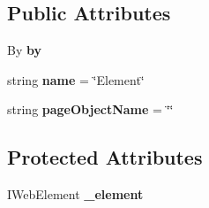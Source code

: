 \subsection*{Public Attributes}
\begin{DoxyCompactItemize}
\item 
\hypertarget{class_proto_test_1_1_golem_1_1_web_driver_1_1_element_a16bb5e344819e39647be80e9cbc7e6ad}{By {\bfseries by}}\label{class_proto_test_1_1_golem_1_1_web_driver_1_1_element_a16bb5e344819e39647be80e9cbc7e6ad}

\item 
\hypertarget{class_proto_test_1_1_golem_1_1_web_driver_1_1_element_a54ee102321b3b75ab85e1fbab0ad178b}{string {\bfseries name} = \char`\"{}Element\char`\"{}}\label{class_proto_test_1_1_golem_1_1_web_driver_1_1_element_a54ee102321b3b75ab85e1fbab0ad178b}

\item 
\hypertarget{class_proto_test_1_1_golem_1_1_web_driver_1_1_element_ab72ea052a9c7d0181896be9815427536}{string {\bfseries page\-Object\-Name} = \char`\"{}\char`\"{}}\label{class_proto_test_1_1_golem_1_1_web_driver_1_1_element_ab72ea052a9c7d0181896be9815427536}

\end{DoxyCompactItemize}
\subsection*{Protected Attributes}
\begin{DoxyCompactItemize}
\item 
\hypertarget{class_proto_test_1_1_golem_1_1_web_driver_1_1_element_aca8df8cb92f2add867faafe92fdb283d}{I\-Web\-Element {\bfseries \-\_\-element}}\label{class_proto_test_1_1_golem_1_1_web_driver_1_1_element_aca8df8cb92f2add867faafe92fdb283d}

\end{DoxyCompactItemize}
